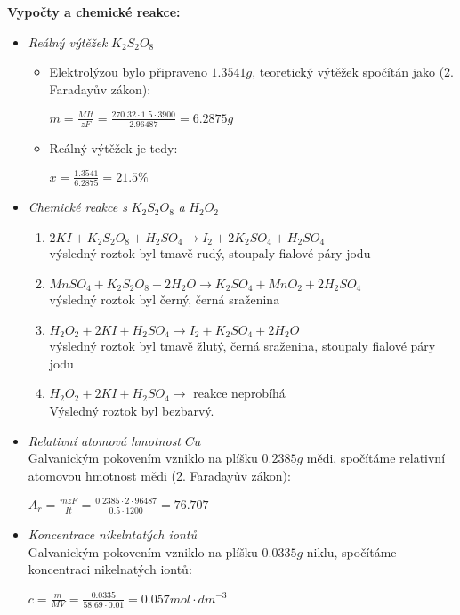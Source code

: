 \documentclass[13pt, a4paper, twoside]{article}
\begin{document}
\textbf{Vypočty a chemické reakce:}
\begin{itemize}
    \item \emph{Reálný výtěžek} $K_2S_2O_8$
    \begin{itemize}
        \item Elektrolýzou bylo připraveno $1.3541g$, teoretický výtěžek spočítán jako (2. Faradayův zákon):
        \begin{center}
            \Large
            $m=\frac{MIt}{zF}=\frac{270.32 \cdot 1.5 \cdot 3900}{2.96487}=6.2875g$
        \end{center}
        \item Reálný výtěžek je tedy:
        \begin{center}
            \Large
            $x=\frac{1.3541}{6.2875}=21.5\%$
        \end{center}
    \end{itemize}
    \item \emph{Chemické reakce s } $K_2S_2O_8$ \emph{a} $H_2O_2$
    \begin{enumerate}[label=\Alph*.]
        \item $2KI + K_2S_2O_8 + H_2SO_4 \to I_2 + 2K_2SO_4 + H_2SO_4$
        \\ výsledný roztok byl tmavě rudý, stoupaly fialové páry jodu
        \item $MnSO_4 + K_2S_2O_8 + 2H_2O \to K_2SO_4 + MnO_2 + 2H_2SO_4$
        \\ výsledný roztok byl černý, černá sraženina
        \item $H_2O_2 + 2KI + H_2SO_4 \to I_2 + K_2SO_4 + 2H_2O$
        \\ výsledný roztok byl tmavě žlutý, černá sraženina, stoupaly fialové páry jodu
        \item $H_2O_2 + 2KI + H_2SO_4 \to$ reakce neprobíhá
        \\ Výsledný roztok byl bezbarvý.
    \end{enumerate}
    \item \emph{Relativní atomová hmotnost $Cu$}
    \\ Galvanickým pokovením vzniklo na plíšku $0.2385g$ mědi, spočítáme relativní atomovou hmotnost mědi (2. Faradayův zákon):
    \begin{center}
        \Large
        $A_r = \frac{mzF}{It} = \frac{0.2385\cdot 2 \cdot 96487}{0.5 \cdot 1200}=76.707$
    \end{center}
    \item \emph{Koncentrace nikelntatých iontů}
    \\ Galvanickým pokovením vzniklo na plíšku $0.0335g$ niklu, spočítáme koncentraci nikelnatých iontů:
    \begin{center}
        \Large
        $c=\frac{m}{MV}=\frac{0.0335}{58.69\cdot 0.01}=0.057mol\cdot dm^{-3}$
    \end{center}
\end{itemize}
\end{document}
